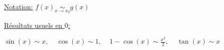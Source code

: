 \documentclass[12pt,twoside,a4paper]{article}
\begin{document}
	\begin{flushleft}
		\underline{Notation:} $f(x)\mathop{\sim}\limits_{x\rightarrow x_0}g(x)$
	\end{flushleft}
	\newpage
	\begin{flushleft}
		\underline{Résultats usuels en $0$:}
		\begin{liste}
			\item $\sin(x)\sim x,\ \ \ \ \ \cos(x)\sim 1,\ \ \ \ \  1-\cos(x)\sim \frac{x^2}2,\ \ \ \ \  \tan(x)\sim x$
		\end{liste}
	\end{flushleft}
\end{document}
